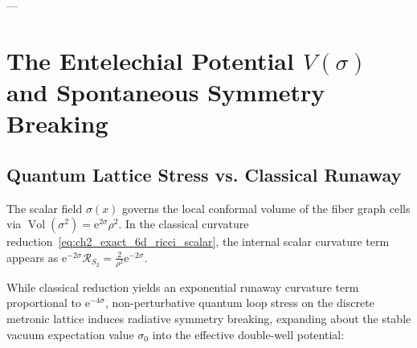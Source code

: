 \documentclass[
    12pt,
    a4paper,
    headings=normal,
    twoside=false,
    open=any,
    parskip=half
]{scrbook}
\DeclareMathOperator{\vol}{Vol}
\newcommand{\eu}{\mathrm{e}}
\begin{document}
---

\section{The Entelechial Potential $V(\sigma)$ and Spontaneous Symmetry Breaking}
\label{sec:ch2_entelechial_potential}

\subsection{Quantum Lattice Stress vs. Classical Runaway}

The scalar field $\sigma(x)$ governs the local conformal volume of the fiber graph cells via $\vol(\sigma^2) = \eu^{2\sigma} \rho^2$. In the classical curvature reduction~\eqref{eq:ch2_exact_6d_ricci_scalar}, the internal scalar curvature term appears as $\eu^{-2\sigma} \mathcal{R}_{S_2} = \frac{2}{\rho^2}\eu^{-2\sigma}$. 

While classical reduction yields an exponential runaway curvature term proportional to $\eu^{-4\sigma}$, non-perturbative quantum loop stress on the discrete metronic lattice induces radiative symmetry breaking, expanding about the stable vacuum expectation value $\sigma_0$ into the effective double-well potential:
\end{document}
